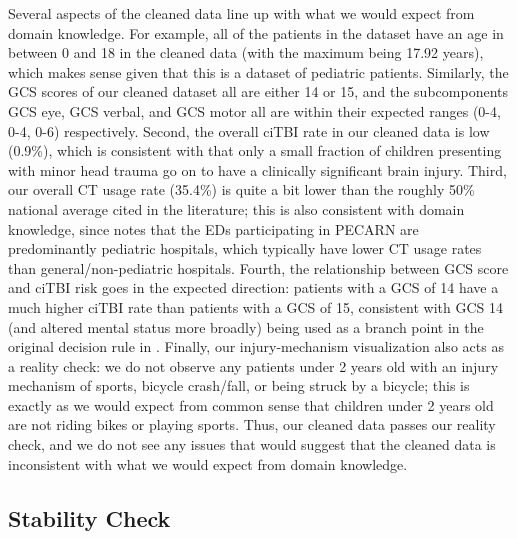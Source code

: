 \documentclass[10pt,letterpaper]{article}
\begin{document}
Several aspects of the cleaned data line up with what we would expect from domain knowledge. For example, all of the patients in the dataset have an age in between 0 and 18 in the cleaned data (with the maximum being 17.92 years), which makes sense given that this is a dataset of pediatric patients.
Similarly, the GCS scores of our cleaned dataset all are either 14 or 15, and the subcomponents GCS eye, GCS verbal, and GCS motor all are within their expected
ranges (0-4, 0-4, 0-6) respectively. Second, the overall ciTBI rate in our cleaned data is low (0.9\%), which is consistent with \cite{Kuppermann2009} that only a small fraction of children presenting with minor head trauma go on to have a clinically significant brain injury.
Third, our overall CT usage rate (35.4\%) is quite a bit lower than the roughly 50\% national average cited in the literature; this is also consistent with domain knowledge, since \cite{Kuppermann2009} notes that the EDs participating in PECARN are predominantly pediatric hospitals, which typically have 
lower CT usage rates than general/non-pediatric hospitals. Fourth, the relationship between GCS score and ciTBI risk goes in the expected direction: patients with a GCS of 14 have a much higher ciTBI rate than patients with a GCS of 15, consistent with GCS 14 (and altered mental status more broadly)
being used as a branch point in the original decision rule in \cite{Kuppermann2009}. Finally, our injury-mechanism visualization also acts as a reality check: we do not observe any patients under 2 years old with an injury mechanism of sports, bicycle crash/fall, or being struck by a bicycle; this
is exactly as we would expect from common sense that children under 2 years old are not riding bikes or playing sports.
Thus, our cleaned data passes our reality check, and we do not see any issues that would suggest that the cleaned data is inconsistent with what we would expect from domain knowledge.


\subsection{Stability Check}\label{stability-check}
\end{document}
